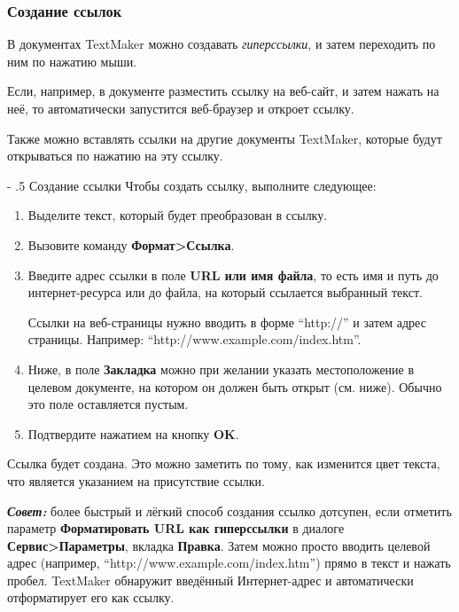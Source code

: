 ﻿\documentclass[a4paper,10pt]{article}
\makeatletter
\renewcommand\paragraph{%
   \@startsection{paragraph}{4}{0mm}%
      {-\baselineskip}%
      {.5\baselineskip}%
      {\normalfont\normalsize\bfseries}}
\makeatother
\begin{document}
\subsubsection{Создание ссылок} \label{sec:создссылок}
В документах TextMaker можно создавать \textit{гиперссылки}, и затем переходить по ним по нажатию мыши.

Если, например, в документе разместить ссылку на веб-сайт, и затем нажать на неё, то автоматически запустится веб-браузер и откроет ссылку.

Также можно вставлять ссылки на другие документы TextMaker, которые будут открываться по нажатию на эту ссылку.

\paragraph{Создание ссылки}
Чтобы создать ссылку, выполните следующее:
\begin{enumerate}
 \item Выделите текст, который будет преобразован в ссылку.
 \item Вызовите команду \textbf{Формат>Ссылка}.
 \item Введите адрес ссылки в поле \textbf{URL или имя файла}, то есть имя и путь до интернет-ресурса или до файла, на который ссылается выбранный текст.
 
 Ссылки на веб-страницы нужно вводить в форме “http://” и затем адрес страницы. Например: “http://www.example.com/index.htm”.
 \item Ниже, в поле \textbf{Закладка} можно при желании указать местоположение в целевом документе, на котором он должен быть открыт (см. ниже). Обычно это поле оставляется пустым.
 \item Подтвердите нажатием на кнопку \textbf{OK}.
\end{enumerate}

Ссылка будет создана. Это можно заметить по тому, как изменится цвет текста, что является указанием на присутствие ссылки.

\begin{mdframed}[backgroundcolor=blue!10]
\textbf{\textit{Совет:}} более быстрый и лёгкий способ создания ссылко дотсупен, если отметить параметр \textbf{Форматировать URL как гиперссылки} в диалоге \textbf{Сервис>Параметры}, вкладка \textbf{Правка}. Затем можно просто вводить целевой адрес (например, “http://www.example.com/index.htm”) прямо в текст и нажать пробел. TextMaker обнаружит введённый Интернет-адрес и автоматически отформатирует его как ссылку.
\end{mdframed}
\end{document}
